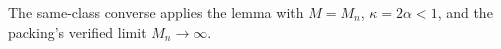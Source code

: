 The same-class converse applies the lemma with \(M=M_n\), \(\kappa=2\alpha<1\), and the packing's verified limit \(M_n\to\infty\).